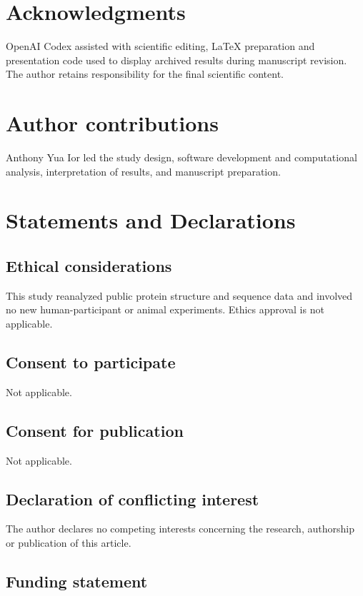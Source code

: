 \documentclass[11pt,a4paper]{article}
\begin{document}
\section{Acknowledgments}

OpenAI Codex assisted with scientific editing, LaTeX preparation and presentation code used to display archived results during manuscript revision. The author retains responsibility for the final scientific content.

\section{Author contributions}

Anthony Yua Ior led the study design, software development and computational analysis, interpretation of results, and manuscript preparation.

\section{Statements and Declarations}

\subsection{Ethical considerations}

This study reanalyzed public protein structure and sequence data and involved no new human-participant or animal experiments. Ethics approval is not applicable.

\subsection{Consent to participate}

Not applicable.

\subsection{Consent for publication}

Not applicable.

\subsection{Declaration of conflicting interest}

The author declares no competing interests concerning the research, authorship or publication of this article.

\subsection{Funding statement}
\end{document}
